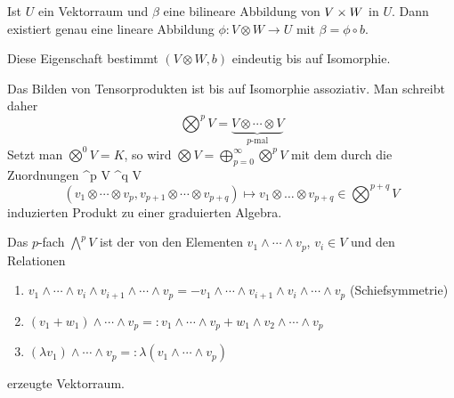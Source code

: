 \begin{emptythm}
Ist $U$ ein Vektorraum und $\beta$ eine bilineare Abbildung von $V \times W$ in $U$. Dann existiert genau eine lineare Abbildung $\phi: V \otimes W \to U$ mit $\beta = \phi \circ b$.
\begin{center}\end{center}
Diese Eigenschaft bestimmt $(V \otimes W, b)$ eindeutig bis auf Isomorphie.
\end{emptythm}

Das Bilden von Tensorprodukten ist bis auf Isomorphie assoziativ. Man schreibt daher
	\[ \bigotimes^p V = \underbrace{V \otimes \cdots \otimes V}_{p\text{-mal}} \]
Setzt man $\bigotimes^0 V = K$, so wird $\bigotimes V = \bigoplus_{p=0}^{\infty} \bigotimes^p V$ mit dem durch die Zuordnungen
	\bigotimes^p V \times \bigotimes^q V\ni\[ (v_1 \otimes \cdots \otimes v_p, v_{p+1} \otimes \cdots \otimes v_{p+q}) \mapsto v_1 \otimes \ldots \otimes v_{p+q} \in \bigotimes^{p+q} V \]
induzierten Produkt zu einer graduierten Algebra.

Das $p$-fach  $\bigwedge^pV$ ist der von den Elementen $v_1 \wedge \cdots \wedge v_p$, $v_i \in V$ und den Relationen \begin{enumerate}[label=(\roman*),widest=iii]
\item
	$v_1 \wedge \cdots \wedge v_i \wedge v_{i+1} \wedge \cdots \wedge v_p = - v_1 \wedge \cdots \wedge v_{i+1} \wedge v_i \wedge \cdots \wedge v_p$ (Schiefsymmetrie)
\item
	$(v_1 + w_1) \wedge \cdots \wedge v_p =: v_1 \wedge \cdots \wedge v_p + w_1 \wedge v_2 \wedge \cdots \wedge v_p$
\item
	$(\lambda v_1) \wedge \cdots \wedge v_p =: \lambda (v_1 \wedge \cdots \wedge v_p)$
\end{enumerate}
erzeugte Vektorraum.

